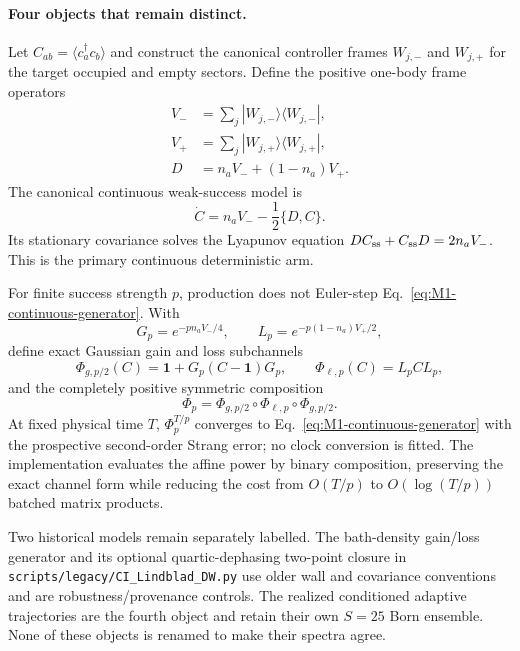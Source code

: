 \documentclass[aps,prx,twocolumn,floatfix,nofootinbib,superscriptaddress,longbibliography]{revtex4-2}
\newcommand{\code}[1]{\texttt{#1}}
\begin{document}
\paragraph*{Four objects that remain distinct.}
Let $C_{ab}=\langle c_a^\dagger c_b\rangle$ and construct the canonical controller frames
$W_{j,-}$ and $W_{j,+}$ for the target occupied and empty sectors.  Define the positive
one-body frame operators
\begin{equation}
 \begin{aligned}
 V_-&=\sum_j |W_{j,-}\rangle\langle W_{j,-}|,\\
 V_+&=\sum_j |W_{j,+}\rangle\langle W_{j,+}|,\\
 D&=n_aV_-+(1-n_a)V_+ .
 \end{aligned}
 \label{eq:M1-frame-operators}
\end{equation}
The canonical continuous weak-success model is
\begin{equation}
 \dot C=n_aV_- -\frac12\{D,C\}.
 \label{eq:M1-continuous-generator}
\end{equation}
Its stationary covariance solves the Lyapunov equation
$DC_{\rm ss}+C_{\rm ss}D=2n_aV_-$.  This is the primary continuous deterministic arm.

For finite success strength $p$, production does not Euler-step
Eq.~\eqref{eq:M1-continuous-generator}.  With
\begin{equation}
 G_p=e^{-pn_aV_-/4},\qquad
 L_p=e^{-p(1-n_a)V_+/2},
\end{equation}
define exact Gaussian gain and loss subchannels
\begin{equation}
 \Phi_{g,p/2}(C)=\mathbf{1}+G_p(C-\mathbf{1})G_p,
 \qquad
 \Phi_{\ell,p}(C)=L_pCL_p,
\end{equation}
and the completely positive symmetric composition
\begin{equation}
 \Phi_p=\Phi_{g,p/2}\circ\Phi_{\ell,p}\circ\Phi_{g,p/2}.
 \label{eq:M1-finite-channel}
\end{equation}
At fixed physical time $T$, $\Phi_p^{T/p}$ converges to
Eq.~\eqref{eq:M1-continuous-generator} with the prospective second-order Strang error;
no clock conversion is fitted.  The implementation evaluates the affine power by binary
composition, preserving the exact channel form while reducing the cost from $O(T/p)$ to
$O(\log(T/p))$ batched matrix products.

Two historical models remain separately labelled.  The bath-density gain/loss generator
and its optional quartic-dephasing two-point closure in
\code{scripts/legacy/CI\_Lindblad\_DW.py} use older wall and covariance conventions and
are robustness/provenance controls.  The realized conditioned adaptive trajectories are
the fourth object and retain their own $S=25$ Born ensemble.  None of these objects is
renamed to make their spectra agree.
\end{document}

